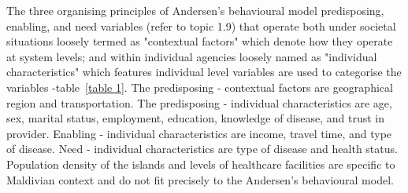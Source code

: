 The three organising principles of Andersen's behavioural model predisposing, enabling, and need variables (refer to topic 1.9) that operate both under societal situations loosely termed as "contextual factors" which denote how they operate at system levels; and within individual agencies loosely named as "individual characteristics" which features individual level variables are used to categorise the variables -table~\ref{table 1}. The predisposing - contextual factors are geographical region and transportation. The predisposing - individual characteristics are age, sex, marital status, employment, education, knowledge of disease, and trust in provider. Enabling - individual characteristics are income, travel time, and type of disease. Need - individual characteristics are type of disease and health status. Population density of the islands and levels of healthcare facilities are specific to Maldivian context and do not fit precisely to the Andersen's behavioural model. 

